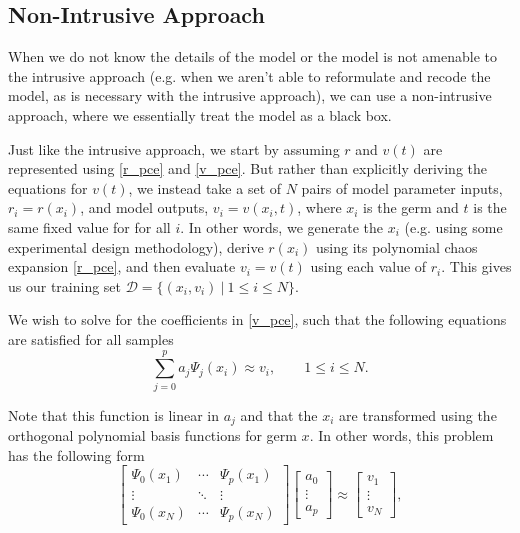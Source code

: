 \documentclass[11pt]{article}
\numberwithin{equation}{section}
\begin{document}
\subsection{Non-Intrusive Approach}

When we do not know the details of the model or the model is not amenable to the intrusive approach (e.g. when we aren't able to reformulate and recode the model, as is necessary with the intrusive approach), we can use a non-intrusive approach, where we essentially treat the model as a black box.

\qquad Just like the intrusive approach, we start by assuming $r$ and $v(t)$ are represented using \eqref{r_pce} and \eqref{v_pce}. But rather than explicitly deriving the equations for $v(t)$, we instead take a set of $N$ pairs of model parameter inputs, $r_i = r(x_i)$, and model outputs, $v_i = v(x_i, t)$, where $x_i$ is the germ and $t$ is the same fixed value for for all $i$. In other words, we generate the $x_i$ (e.g. using some experimental design methodology), derive $r(x_i)$ using its polynomial chaos expansion \eqref{r_pce}, and then evaluate $v_i = v(t)$ using each value of $r_i$. This gives us our training set $\mathcal{D} = \{ (x_i, v_i) \ | \ 1 \leq i \leq N \}$.

\qquad We wish to solve for the coefficients in \eqref{v_pce}, such that the following equations are satisfied for all samples
\begin{equation}
\sum_{j=0}^{p}  a_j \Psi_j(x_i) \approx v_i, \qquad 1 \leq i \leq N. \label{pce_train} 
\end{equation}

Note that this function is linear in $a_j$ and that the $x_i$ are transformed using the orthogonal polynomial basis functions for germ $x$. In other words, this problem has the following form
\begin{equation}
\begin{bmatrix} \Psi_0(x_1) & \cdots & \Psi_p(x_1) \\ \vdots & \ddots & \vdots \\ \Psi_0(x_N) & \cdots & \Psi_p(x_N) \end{bmatrix}
\begin{bmatrix} a_0 \\  \vdots \\  a_p \end{bmatrix}
\approx
\begin{bmatrix} v_1 \\  \vdots \\  v_N \end{bmatrix},
\end{equation}
\end{document}
